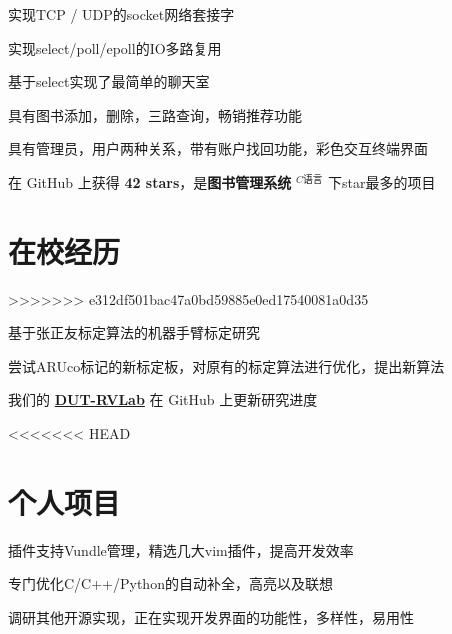 \documentclass[]{deedy-resume-openfont}
\begin{document}
\begin{minipage}[t]{0.73\textwidth}
\begin{tightemize}
    \item 实现TCP / UDP的socket网络套接字
    \item 实现select/poll/epoll的IO多路复用
    \item 基于select实现了最简单的聊天室
    \end{tightemize}
\sectionsep

\begin{tightemize}
    \item 具有图书添加，删除，三路查询，畅销推荐功能
    \item 具有管理员，用户两种关系，带有账户找回功能，彩色交互终端界面
    \item 在 GitHub 上获得 \textbf{42 stars}，是\textbf{图书管理系统} $^{C语言}$ 下star最多的项目
    \end{tightemize}
\sectionsep


\section{在校经历}
\sectionsep
{}
>>>>>>> e312df501bac47a0bd59885e0ed17540081a0d35
\begin{tightemize}
    \item 基于张正友标定算法的机器手臂标定研究
    \item 尝试ARUco标记的新标定板，对原有的标定算法进行优化，提出新算法
    \item 我们的 \href{https://github.com/DUT-RVLab}{\bf DUT-RVLab} 在 GitHub 上更新研究进度
    \end{tightemize}
\sectionsep

<<<<<<< HEAD

\section{个人项目}
\sectionsep
{}
\begin{tightemize}
    \item 插件支持Vundle管理，精选几大vim插件，提高开发效率
    \item 专门优化C/C++/Python的自动补全，高亮以及联想
    \item 调研其他开源实现，正在实现开发界面的功能性，多样性，易用性
    \end{tightemize}
\sectionsep


\end{minipage}
\end{document}
